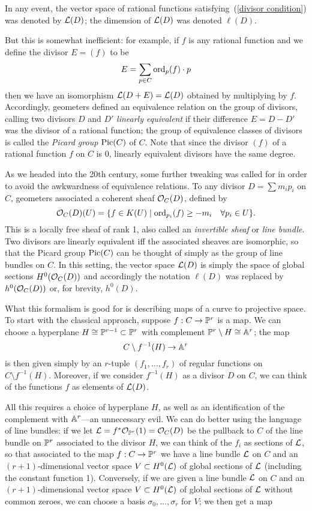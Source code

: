 In any event, the vector space of rational functions satisfying~(\ref{divisor condition}) was denoted by $\cL(D)$; the dimension of $\cL(D)$ was denoted $\ell(D)$.


But this is somewhat inefficient: for example, if $f$ is any rational function and we define the divisor $E = (f)$ to be
$$
E = \sum_{p\in C} \ord_p(f)\cdot p
$$
then we have an isomorphism $\cL(D+E) = \cL(D)$ obtained by multiplying by $f$. Accordingly, geometers defined an equivalence relation on the group of divisors, calling two divisors $D$ and $D'$ \emph{linearly equivalent} if their difference $E = D - D'$ was the divisor of a rational function; the group of equivalence classes of divisors is called the \emph{Picard group} $\Pic(C)$ of $C$. Note that since the divisor $(f)$ of a rational function $f$ on $C$ is 0, linearly equivalent divisors have the same degree.

As we headed into the 20th century, some further tweaking was called for in order to avoid the awkwardness of equivalence relations. To any divisor $D = \sum m_ip_i$ on $C$, geometers associated a coherent sheaf $\cO_C(D)$, defined by
$$
\cO_C(D)(U) = \{ f \in K(U) \mid \ord_{p_i}(f) \geq -m_i \quad \forall p_i \in U \}.
$$
This is a locally free sheaf of rank 1, also called an \emph{invertible sheaf} or \emph{line bundle}. Two divisors are linearly equivalent iff the associated sheaves are isomorphic, so that the Picard group $\Pic(C)$ can be thought of simply as the group of line bundles on $C$. In this setting, the vector space $\cL(D)$ is simply the space of global sections $H^0(\cO_C(D))$ and accordingly the notation $\ell(D)$ was replaced by $h^0(\cO_C(D))$ or, for brevity, $h^0(D)$. 

What this formalism is good for is describing maps of a curve to projective space. To start with the classical approach, suppose $f : C \to \PP^r$ is a map. We can choose a hyperplane $H \cong \PP^{r-1} \subset \PP^r$ with complement $\PP^r \setminus H \cong \AA^r$; the map 
$$
C \setminus f^{-1}(H) \to \AA^r
$$
is then given simply by an $r$-tuple $(f_1,\dots,f_r)$ of regular functions on $C \setminus f^{-1}(H)$. Moreover, if we consider $f^{-1}(H)$ as a divisor $D$ on $C$, we can think of the functions $f$ as elements of $\cL(D)$.

All this requires a choice of hyperplane $H$, as well as an identification of the complement with $\AA^r$---an unnecessary evil. We can do better using the language of line bundles: if we let $\cL = f^*\cO_{\PP^r}(1) = \cO_C(D)$ be the pullback to $C$ of the line bundle on $\PP^r$ associated to the divisor $H$, we can think of the $f_i$ as sections of $\cL$, so that associated to the map $f : C \to \PP^r$ we have a line bundle $\cL$ on $C$ and an $(r+1)$-dimensional vector space $V \subset H^0(\cL)$ of global sections of $\cL$ (including the constant function 1). Conversely, if we are given a line bundle $\cL$ on $C$ and an $(r+1)$-dimensional vector space $V \subset H^0(\cL)$ of global sections of $\cL$ without common zeroes, we can choose a basis $\sigma_0,\dots,\sigma_r$ for $V$; we then get a map 

